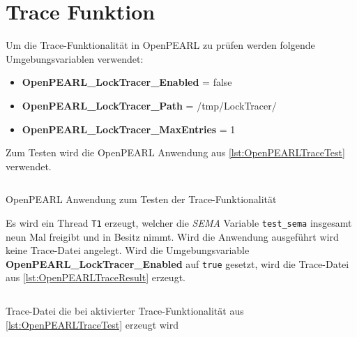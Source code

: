 \section{Trace Funktion}\label{Validierung:Trace Funktion}
\label{section:ValidierungTraceFunktion}
Um die Trace-Funktionalität in OpenPEARL zu prüfen werden folgende
Umgebungsvariablen verwendet:
\begin{itemize}
  \item \textbf{OpenPEARL\-\_LockTracer\-\_Enabled} = false
  \item \textbf{OpenPEARL\-\_LockTracer\-\_Path} = /tmp/LockTracer/
  \item \textbf{OpenPEARL\-\_LockTracer\-\_MaxEntries} = 1
\end{itemize}
Zum Testen wird die OpenPEARL Anwendung aus \cref{lst:OpenPEARLTraceTest}
verwendet. 
\begin{listing}[ht]
  \inputminted[frame=lines,linenos]{vim}{./OpenPEARL/TraceTest.prl}
  \caption{OpenPEARL Anwendung zum Testen der Trace-Funktionalität}
  \label{lst:OpenPEARLTraceTest}
\end{listing}
Es wird ein Thread \texttt{T1} erzeugt, welcher die \emph{SEMA} Variable
\texttt{test\_sema} insgesamt neun Mal freigibt und in Besitz nimmt. Wird die
Anwendung ausgeführt wird keine Trace-Datei angelegt. Wird die Umgebungsvariable
\textbf{OpenPEARL\-\_LockTracer\-\_Enabled} auf \texttt{true} gesetzt, wird die
Trace-Datei aus \cref{lst:OpenPEARLTraceResult} erzeugt.
\begin{listing}[ht]
  \begin{minipage}[ht]{\linewidth}
    \begin{multicols}{2}
      \inputminted[linenos]{text}{./OpenPEARL/TraceTestResult.log}
    \end{multicols}
    \caption{Trace-Datei die bei aktivierter Trace-Funktionalität aus \cref{lst:OpenPEARLTraceTest} erzeugt wird}
  \label{lst:OpenPEARLTraceResult}
  \end{minipage}
\end{listing}


